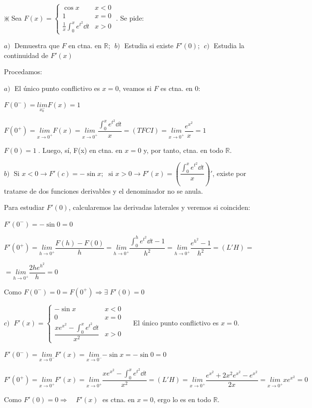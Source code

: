 \begin{ejre}
$\divideontimes\;$Sea $F(x)=\begin{cases} \cos x & x<0 \\ 1 & x=0 \\ \frac 1 x \int_0^x e^{t^2}\dd t & x>0 \end{cases}\; $. Se pide:

$a)\; $ Demuestra que $F$ en ctna. en $\mathbb R$; $\; b)\; $ Estudia si existe $F'(0)$; $\; c)\; $ Estudia la continuidad de $F'(x)$
\end{ejre}
\begin{proofw}\renewcommand{\qedsymbol}{$\diamond$}	
Procedamos:

$a)\; $ El único punto conflictivo es $x=0$, veamos si $F$ es ctna. en $0$:

$F(0^-)=\underset{x_0^-}{lim}{F(x)}=1$

$F(0^+)=\underset {x\to 0^+}{lim }{F(x)}= \underset {x\to 0^+}{lim }{\dfrac {\int_0^x e^{t^2}\dd t}{x}}=(TFCI)= \underset {x\to 0^+}{lim }{\dfrac{e^{x^2}}{x}}=1$

$F(0)=1\; $.  Luego, sí, F(x) en ctna. en $x=0$ y, por tanto, ctna. en todo $\mathbb R$.

$b)\; $ $\text{Si } x<0\to F'(c)=-\sin x; \; \text{ si } x>0 \to F'(x)=\left(\dfrac {\int_0^x e^{t^2} \dd t}{x}\right)'$, existe por tratarse de dos funciones derivables y el denominador no se anula.

Para estudiar $F'(0)$, calcularemos las derivadas laterales y veremos si coinciden:

$F'(0^-)=-\sin 0 =0$

$F'(0^+)=\underset {h\to 0^+}{lim}{\dfrac {F(h)-F(0)}{h}}= 
\underset {h\to 0^+}{lim}{\dfrac {\int_0^h e^{t^2} \dd t - 1}{h^2}}= \underset {h\to 0^+}{lim}{\dfrac{e^{h^2}-1}{h^2}}=(L'H)=$

$=\underset {h\to 0^+}{lim}{\dfrac{2he^{h^2}}{h}}=0$

Como $F(0^-)=0=F(0^+)\Rightarrow \exists \; F'(0)=0$

$c)\; $
$F'(x)=\left\{ \begin{matrix}  -\sin x & x<0 \\ 0 & x=0 \\ \dfrac {x e^{x^2}-\int_0^x e^{t^2} \dd t}{x^2} & x>0  \end{matrix} \right. \quad$  El único punto conflictivo es $x=0$.

$F'(0^-)=\underset{x\to 0^-}{lim }{F'(x)}=\underset{x\to 0^-}{lim }{-\sin x }= - \sin 0 = 0$

$F'(0^+)=\underset{x\to 0^+}{lim }{F'(x)}= \underset{x\to 0^+}{lim }{ \dfrac {x e^{x^2}-\int_0^x e^{t^2} \dd t}{x^2} }= (L'H)=\underset{x\to 0^+}{lim } \dfrac {e^{x^2}+2x^2e^{x^2}-e^{x^2}}{2x}=\underset{x\to 0^+}{lim } {xe^{x^2}}=0$

Como $F'(0)=0 \Rightarrow \quad F'(x)\; $ es ctna. en $x=0$, ergo lo es en todo $\mathbb R$. 

	
\end{proofw}

